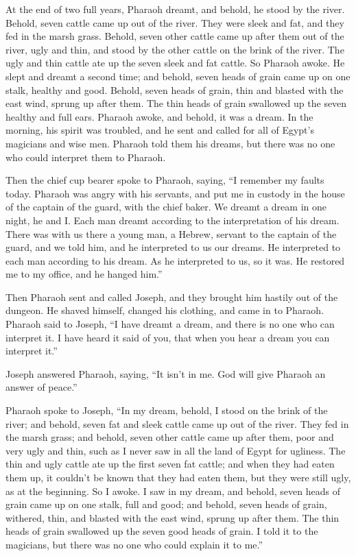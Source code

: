  At the end of two full years, Pharaoh dreamt, and behold,
he stood by the river.  Behold, seven cattle came up out
of the river. They were sleek and fat, and they fed in the marsh grass.
 Behold, seven other cattle came up after them out of the
river, ugly and thin, and stood by the other cattle on the brink of the
river.  The ugly and thin cattle ate up the seven sleek
and fat cattle. So Pharaoh awoke.  He slept and dreamt a
second time; and behold, seven heads of grain came up on one stalk,
healthy and good.  Behold, seven heads of grain, thin and
blasted with the east wind, sprung up after them.  The
thin heads of grain swallowed up the seven healthy and full ears.
Pharaoh awoke, and behold, it was a dream.  In the
morning, his spirit was troubled, and he sent and called for all of
Egypt's magicians and wise men. Pharaoh told them his dreams, but there
was no one who could interpret them to Pharaoh.

 Then the chief cup bearer spoke to Pharaoh, saying, ``I
remember my faults today.  Pharaoh was angry with his
servants, and put me in custody in the house of the captain of the
guard, with the chief baker.  We dreamt a dream in one
night, he and I. Each man dreamt according to the interpretation of his
dream.  There was with us there a young man, a Hebrew,
servant to the captain of the guard, and we told him, and he interpreted
to us our dreams. He interpreted to each man according to his dream.
 As he interpreted to us, so it was. He restored me to my
office, and he hanged him.''

 Then Pharaoh sent and called Joseph, and they brought
him hastily out of the dungeon. He shaved himself, changed his clothing,
and came in to Pharaoh.  Pharaoh said to Joseph, ``I have
dreamt a dream, and there is no one who can interpret it. I have heard
it said of you, that when you hear a dream you can interpret it.''

 Joseph answered Pharaoh, saying, ``It isn't in me. God
will give Pharaoh an answer of peace.''

 Pharaoh spoke to Joseph, ``In my dream, behold, I stood
on the brink of the river;  and behold, seven fat and
sleek cattle came up out of the river. They fed in the marsh grass;
 and behold, seven other cattle came up after them, poor
and very ugly and thin, such as I never saw in all the land of Egypt for
ugliness.  The thin and ugly cattle ate up the first
seven fat cattle;  and when they had eaten them up, it
couldn't be known that they had eaten them, but they were still ugly, as
at the beginning. So I awoke.  I saw in my dream, and
behold, seven heads of grain came up on one stalk, full and good;
 and behold, seven heads of grain, withered, thin, and
blasted with the east wind, sprung up after them.  The
thin heads of grain swallowed up the seven good heads of grain. I told
it to the magicians, but there was no one who could explain it to me.''

